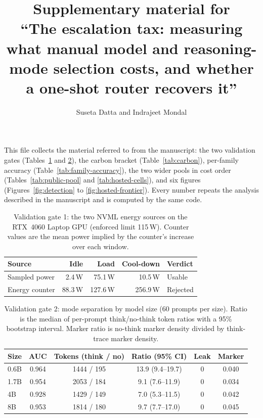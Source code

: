 \documentclass[11pt]{article}
\title{Supplementary material for\\
``The escalation tax: measuring what manual model and reasoning-mode
selection costs, and whether a one-shot router recovers it''}
\author{Suseta Datta and Indrajeet Mondal}
\date{}
\begin{document}
\maketitle

This file collects the material referred to from the manuscript: the two validation
gates (Tables~\ref{tab:gate1} and \ref{tab:gate2}), the carbon bracket
(Table~\ref{tab:carbon}),
per-family accuracy (Table~\ref{tab:family-accuracy}), the two wider pools in
cost order (Tables~\ref{tab:public-pool} and \ref{tab:hosted-cells}), and six
figures (Figures~\ref{fig:detection} to \ref{fig:hosted-frontier}). Every
number repeats the analysis described in the manuscript and is computed by
the same code.

\begin{table}[ht]
\centering
\caption{Validation gate 1: the two NVML energy sources on the RTX~4060
Laptop GPU (enforced limit 115\,W). Counter values are the mean power implied
by the counter's increase over each window.}
\label{tab:gate1}
\renewcommand{\arraystretch}{1.1}
\begin{tabular}{@{}lrrrl@{}}
\toprule
Source & Idle & Load & Cool-down & Verdict \\
\midrule
Sampled power & 2.4\,W & 75.1\,W & 10.5\,W & Usable \\
Energy counter & 88.3\,W & 127.6\,W & 256.9\,W & Rejected \\
\bottomrule
\end{tabular}
\end{table}

\begin{table}[ht]
\centering
\caption{Validation gate 2: mode separation by model size (60 prompts per
size). Ratio is the median of per-prompt think/no-think token ratios with a
95\% bootstrap interval. Marker ratio is no-think marker density divided by
think-trace marker density.}
\label{tab:gate2}
\renewcommand{\arraystretch}{1.1}
\setlength{\tabcolsep}{5pt}
\begin{tabular}{@{}lccccc@{}}
\toprule
Size & AUC & Tokens (think / no) & Ratio (95\% CI) & Leak & Marker \\
\midrule
0.6B & 0.964 & 1444 / 195 & 13.9 (9.4--19.7) & 0 & 0.040 \\
1.7B & 0.954 & 2053 / 184 & 9.1 (7.6--11.9)  & 0 & 0.034 \\
4B   & 0.928 & 1429 / 149 & 7.0 (5.3--11.5)  & 0 & 0.042 \\
8B   & 0.953 & 1814 / 180 & 9.7 (7.7--17.0)  & 0 & 0.045 \\
\bottomrule
\end{tabular}
\end{table}
\end{document}
